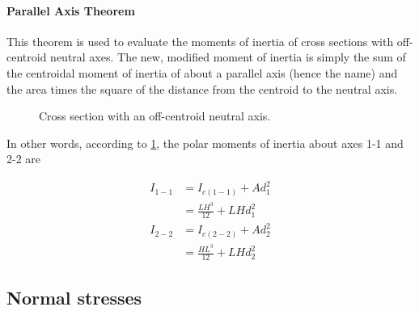 \documentclass[
fontsize=10pt,
a4paper,
twosides=false,
open=any,
svgnames,
]{kaobook} %
\begin{document}
\paragraph{Parallel Axis Theorem}

This theorem is used to evaluate the moments of inertia of cross sections with off-centroid neutral axes. The new, modified moment of inertia is simply the sum of the centroidal moment of inertia of about a parallel axis (hence the name) and the area times the square of the distance from the centroid to the neutral axis.

\begin{figure}[h]
  \centering
  \caption{Cross section with an off-centroid neutral axis.}
  \label{fig: parallel axis theorem}
\end{figure}

In other words, according to \cref{fig: parallel axis theorem}, the polar moments of inertia about axes 1-1 and 2-2 are

\begin{equation}
  \begin{aligned}
    I_{1-1} &= I_{c(1-1)} + Ad_1^2 \\
    & = \frac{LH^3}{12} + LHd_1^2 \\
    I_{2-2} &= I_{c(2-2)} + Ad_2^2 \\
    &= \frac{HL^3}{12} + LHd_2^2
  \end{aligned}
\end{equation}

\subsection{Normal stresses}
\end{document}
